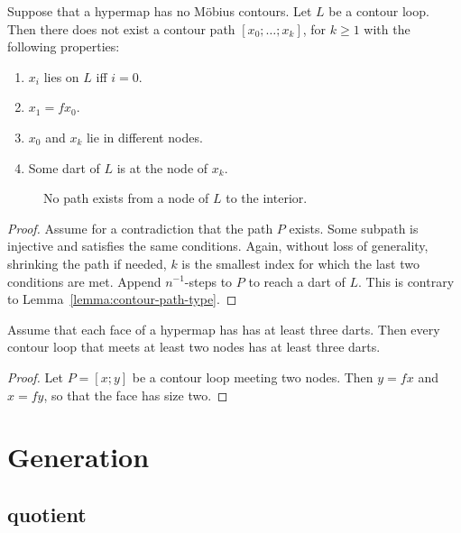 \begin{lemma}
Suppose that a hypermap has no M\"obius contours.  Let $L$ be a contour loop.
Then there does not exist a contour path
$[x_0;\ldots;x_k]$, for $k\ge 1$ with the following properties:
\begin{enumerate}
\item $x_i$ lies on $L$ iff $i=0$.
\item $x_1 = f x_0$.
\item $x_0$ and $x_k$ lie in different nodes.
\item Some dart of $L$ is at the node of $x_k$.
\end{enumerate}
\end{lemma}

\begin{figure}[htb]
  \centering
  \caption{No path exists from a node of $L$ to the interior.}
  \label{fig:no-node-path}
\end{figure}

\begin{proof}  Assume for a contradiction that the path $P$ exists.  Some subpath is injective and satisfies the same conditions.  Again, without loss of generality, shrinking the path if needed, $k$ is the smallest index for which the last two conditions are met.  Append $n^{-1}$-steps to $P$ to reach a dart of $L$.  This is contrary to Lemma~\ref{lemma:contour-path-type}.
\end{proof}

\begin{lemma}\label{lemma:3dart}  
Assume that each face of a hypermap has has at least three darts.  Then every contour loop that meets at least two nodes has at least three darts.
\end{lemma}

\begin{proof}  Let $P=[x;y]$ be a contour loop meeting  two nodes.  Then $y = f x$ and $x = f y$, so that the face has size two.
\end{proof}

\section{Generation}

\subsection{quotient}

